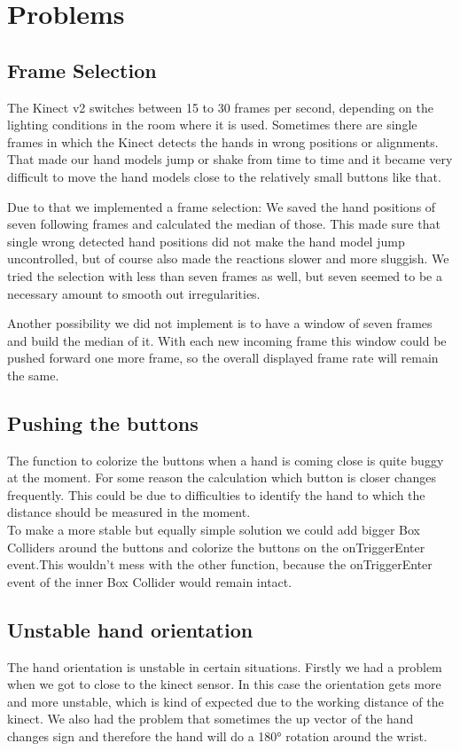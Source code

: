 \documentclass[11pt,a4paper,oldfontcommands, oneside]{memoir}
\begin{document}
\section{Problems}
\subsection{Frame Selection}

The Kinect v2 switches between 15 to 30 frames per second, depending on the lighting conditions in the room where it is used.
Sometimes there are single frames in which the Kinect detects the hands in wrong positions or alignments. That made our hand models jump or shake from time to time and it became very difficult to move the hand models close to the relatively small buttons like that.


Due to that we implemented a frame selection: We saved the hand positions of seven following frames and calculated the median of those. This made sure that single wrong detected hand positions did not make the hand model jump uncontrolled, but of course also made the reactions slower and more sluggish.
We tried the selection with less than seven frames as well, but seven seemed to be a necessary amount to smooth out irregularities.


Another possibility we did not implement is to have a window of seven frames and build the median of it. With each new incoming frame this window could be pushed forward one more frame, so the overall displayed frame rate will remain the same.\\


\subsection{Pushing the buttons}
The function to colorize the buttons when a hand is coming close is quite buggy at the moment. For some reason the calculation which button is closer changes frequently. This could be due to difficulties to identify the hand to which the distance should be measured in the moment.\\
To make a more stable but equally simple solution we could add bigger Box Colliders around the buttons and colorize the buttons on the onTriggerEnter event.This wouldn't mess with the other function, because the onTriggerEnter event of the inner Box Collider would remain intact. 

\subsection{Unstable hand orientation}
The hand orientation is unstable in certain situations. Firstly we had a problem when we got to close to the kinect sensor. In this case the orientation gets more and more unstable, which is kind of expected due to the working distance of the kinect. We also had the problem that sometimes the up vector of the hand changes sign and therefore the hand will do a 180° rotation around the wrist.
\end{document}
